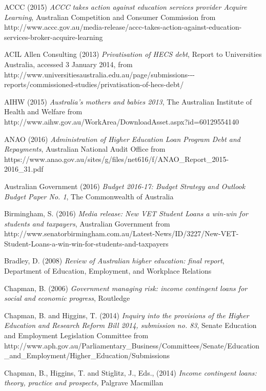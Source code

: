 \documentclass[]{book}
\begin{document}
\protect\hypertarget{_ENREF_7}{}{}ACCC (2015) \emph{ACCC takes action against education services provider Acquire Learning}, Australian Competition and Consumer Commission from http://www.accc.gov.au/media-release/accc-takes-action-against-education-services-broker-acquire-learning

\protect\hypertarget{_ENREF_8}{}{}ACIL Allen Consulting (2013) \emph{Privatisation of HECS debt}, Report to Universities Australia, accessed 3 January 2014, from http://www.universitiesaustralia.edu.au/page/submissions-\/-\/-reports/commissioned-studies/privatisation-of-hecs-debt/

\protect\hypertarget{_ENREF_9}{}{}AIHW (2015) \emph{Australia's mothers and babies 2013}, The Australian Institute of Health and Welfare from http://www.aihw.gov.au/WorkArea/DownloadAsset.aspx?id=60129554140

\protect\hypertarget{_ENREF_10}{}{}ANAO (2016) \emph{Administration of Higher Education Loan Program Debt and Repayments}, Australian National Audit Office from https://www.anao.gov.au/sites/g/files/net616/f/ANAO\_Report\_2015-2016\_31.pdf

\protect\hypertarget{_ENREF_11}{}{}Australian Government (2016) \emph{Budget 2016-17: Budget Strategy and Outlook Budget Paper No. 1}, The Commonwealth of Australia

\protect\hypertarget{_ENREF_12}{}{}Birmingham, S. (2016) \emph{Media release: New VET Student Loans a win-win for students and taxpayers}, Australian Government from http://www.senatorbirmingham.com.au/Latest-News/ID/3227/New-VET-Student-Loans-a-win-win-for-students-and-taxpayers

\protect\hypertarget{_ENREF_13}{}{}Bradley, D. (2008) \emph{Review of Australian higher education: final report}, Department of Education, Employment, and Workplace Relations

\protect\hypertarget{_ENREF_14}{}{}Chapman, B. (2006) \emph{Government managing risk: income contingent loans for social and economic progress}, Routledge

\protect\hypertarget{_ENREF_15}{}{}Chapman, B. and Higgins, T. (2014) \emph{Inquiry into the provisions of the Higher Education and Research Reform Bill 2014, submission no. 83}, Senate Education and Employment Legislation Committee from http://www.aph.gov.au/Parliamentary\_Business/Committees/Senate/Education\_and\_Employment/Higher\_Education/Submissions

\protect\hypertarget{_ENREF_16}{}{}Chapman, B., Higgins, T. and Stiglitz, J., Eds., (2014) \emph{Income contingent loans: theory, practice and prospects,} Palgrave Macmillan
\end{document}
